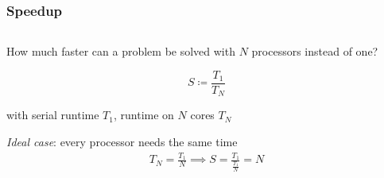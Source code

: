 \documentclass[aspectratio=169]{beamer}
\begin{document}
\begin{frame}
	\frametitle{Speedup}

	\begin{columns}
		\begin{column}{\textwidth}
			How much faster can a problem be solved with \(N\) processors instead of one?
			
			\begin{equation}
				S \coloneqq \frac{T_1}{T_N}
			\end{equation}

			with serial runtime \(T_1\), runtime on \(N\) cores \(T_N\)

			\vspace{10pt}

			\emph{Ideal case}: every processor needs the same time
			\begin{align}
				T_N = \frac{T_1}{N}
				\implies S = \frac{T_1}{\frac{T_1}{N}} = N
			\end{align}

				
		\end{column}

	\end{columns}
\end{frame}
\end{document}
